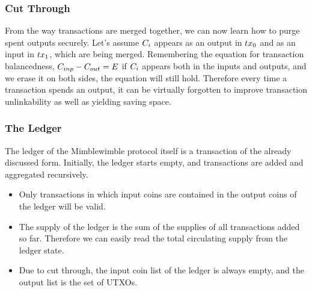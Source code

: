 \subsubsection{Cut Through}
From the way transactions are merged together, we can now learn how to purge spent outputs securely. Let's assume $C_i$ appears as an output in $tx_0$ and as an input in $tx_1$,
which are being merged. Remembering the equation for transaction balancedness, $C_{inp} - C_{out} = E$ if $C_i$ appears both in the inputs and outputs, and we erase it on both sides, the equation will still hold.
Therefore every time a transaction spends an output, it can be virtually forgotten to improve transaction unlinkability as well as yielding saving space.

\subsubsection{The Ledger}
The ledger of the Mimblewimble protocol itself is a transaction of the already discussed form. Initially, the ledger starts empty, and transactions are added and aggregated recursively.
\begin{itemize}
    \item Only transactions in which input coins are contained in the output coins of the ledger will be valid.
    \item The supply of the ledger is the sum of the supplies of all transactions added so far. Therefore we can easily read the total circulating supply from the ledger state.
    \item Due to cut through, the input coin list of the ledger is always empty, and the output list is the set of UTXOs.
\end{itemize}

